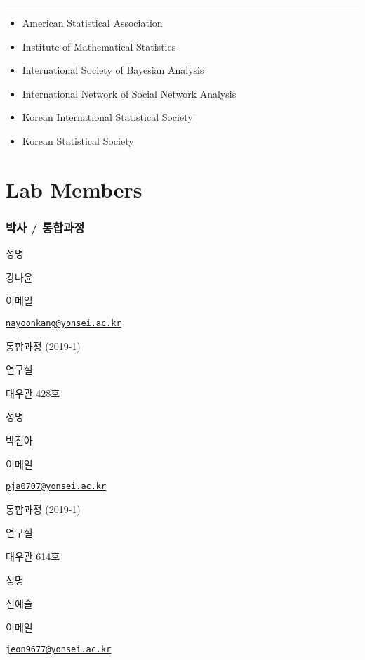 \documentclass[]{book}
\providecommand{\tightlist}{%
  \setlength{\itemsep}{0pt}\setlength{\parskip}{0pt}}
\begin{document}
\begin{center}\rule{0.5\linewidth}{0.5pt}\end{center}

\begin{itemize}
\tightlist
\item
  American Statistical Association
\item
  Institute of Mathematical Statistics
\item
  International Society of Bayesian Analysis
\item
  International Network of Social Network Analysis
\item
  Korean International Statistical Society
\item
  Korean Statistical Society
\end{itemize}

\hypertarget{lab-members}{%
\chapter*{Lab Members}\label{lab-members}}

\hypertarget{uxbc15uxc0ac-uxd1b5uxd569uxacfcuxc815}{%
\subsection*{박사 / 통합과정}\label{uxbc15uxc0ac-uxd1b5uxd569uxacfcuxc815}}

성명

강나윤

이메일

\href{mailto:nayoonkang@yonsei.ac.kr}{\nolinkurl{nayoonkang@yonsei.ac.kr}}

통합과정 (2019-1)

연구실

대우관 428호

성명

박진아

이메일

\href{mailto:pja0707@yonsei.ac.kr}{\nolinkurl{pja0707@yonsei.ac.kr}}

통합과정 (2019-1)

연구실

대우관 614호

성명

전예슬

이메일

\href{mailto:jeon9677@yonsei.ac.kr}{\nolinkurl{jeon9677@yonsei.ac.kr}}
\end{document}
